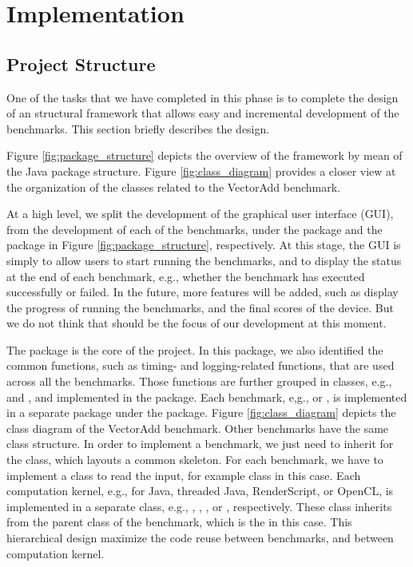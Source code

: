 \section*{Implementation}

\subsection*{Project Structure}

One of the tasks that we have completed in this phase is to complete the design
of an structural framework that allows easy and incremental development of the
benchmarks. This section briefly describes the design.

Figure \ref{fig:package_structure} depicts the overview of the framework by mean
of the Java package structure. Figure \ref{fig:class_diagram} provides a closer
view at the organization of the classes related to the VectorAdd benchmark.

At a high level, we split the development of the graphical user interface (GUI),
from the development of each of the benchmarks, under the  package and the
 package in Figure \ref{fig:package_structure}, respectively. At this
stage, the GUI is simply to allow users to start running the benchmarks, and to 
display the status at the end of each benchmark, e.g., whether the benchmark has executed
successfully or failed. In the future, more features will be added, such as
display the progress of running the benchmarks, and the final scores of the
device. But we do not think that should be the focus of our development at this
moment.

The  package is the core of the project. In this package, we also
identified the common functions, such as timing- and logging-related functions,
that are used across all the benchmarks. Those functions are further grouped in
classes, e.g.,  and , and implemented in the 
package. Each benchmark, e,g.,  or , is implemented in a
separate package under the  package. Figure
\ref{fig:class_diagram} depicts the class diagram of the VectorAdd benchmark.
Other benchmarks have the same class structure. In order to implement a
benchmark, we just need to inherit for the  class, which
layouts a common skeleton. For each benchmark, we have to implement a class to
read the input, for example  class in this case. Each
computation kernel, e.g., for Java, threaded Java, RenderScript, or OpenCL, is
implemented in a separate class, e.g., ,
, , or ,
respectively. These class inherits from the parent class of the benchmark, which
is the  in this case. This hierarchical design maximize
the code reuse between benchmarks, and between computation kernel.

